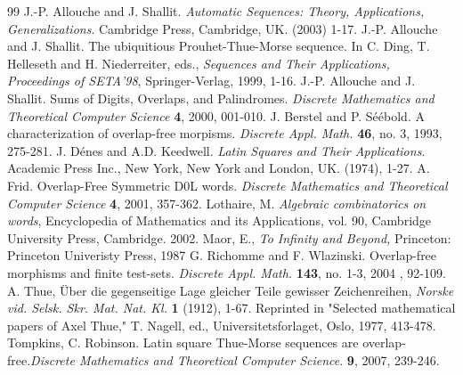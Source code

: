 \documentclass[12pt]{amsart}
\theoremstyle{definition}
\theoremstyle{plain}
\theoremstyle{nameit}
\theoremstyle{plain}
\begin{document}
\begin{onehalfspace}
\begin{thebibliography}{99}
  J.-P. Allouche and J. Shallit. \emph{Automatic Sequences:
 Theory, Applications, Generalizations}. Cambridge Press, Cambridge,
 UK. (2003) 1-17.
  J.-P. Allouche and J. Shallit. The ubiquitious
 Prouhet-Thue-Morse sequence. In C. Ding, T. Helleseth and H.
 Niederreiter, eds., \emph{Sequences and Their Applications,
 Proceedings of SETA'98}, Springer-Verlag, 1999, 1-16.
  J.-P. Allouche and J. Shallit. Sums of Digits,
 Overlaps, and Palindromes. \emph{Discrete Mathematics and
 Theoretical Computer Science} \textbf{4}, 2000, 001-010.
  J. Berstel and P. S\'e\'ebold. A
 characterization of overlap-free morpisms. \emph{Discrete Appl. Math.}
 \textbf{46}, no. 3, 1993, 275-281.
  J. D\'enes and A.D. Keedwell. \emph{Latin Squares and
 Their Applications}. Academic Press Inc., New York, New York and
 London, UK. (1974), 1-27.
  A. Frid. Overlap-Free Symmetric D0L words.
 \emph{Discrete Mathematics and Theoretical Computer Science}
 \textbf{4}, 2001, 357-362.
  Lothaire, M. \emph{Algebraic combinatorics on
 words}, Encyclopedia of Mathematics and its Applications, vol. 90,
 Cambridge University Press, Cambridge. 2002.
  Maor, E., \emph{To Infinity and Beyond,} Princeton: Princeton Univeristy Press, 1987
  G. Richomme and F. Wlazinski. Overlap-free
 morphisms and finite test-sets. \emph{Discrete Appl. Math.} \textbf{143}, no. 1-3, 2004
 , 92-109.
  A. Thue, \"Uber die gegenseitige Lage gleicher Teile
 gewisser Zeichenreihen, \emph{Norske vid. Selsk. Skr. Mat. Nat. Kl.}
 \textbf{1} (1912), 1-67. Reprinted in "Selected mathematical papers of Axel Thue," T.
 Nagell, ed., Universitetsforlaget, Oslo, 1977, 413-478.
  Tompkins, C. Robinson. Latin square Thue-Morse sequences
 are overlap-free.\emph{Discrete Mathematics and Theoretical Computer
 Science}. \textbf{9}, 2007, 239-246.
\end{thebibliography}


\end{onehalfspace}
\end{document}
